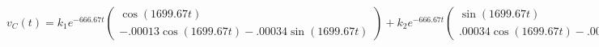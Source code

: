 \documentclass[preview]{standalone}
\begin{document}
\begin{center}
\[
                                                v_C(t) = k_1e^{-666.67t}
                                                \begin{pmatrix} 
                                                \cos(1699.67t) \\ 
                                                -.00013\cos(1699.67t) - .00034\sin(1699.67t)
                                                \end{pmatrix}
                                                + k_2e^{-666.67t}
                                                \begin{pmatrix} 
                                                \sin(1699.67t) \\ 
                                                .00034\cos(1699.67t) - .00013\sin(1699.67t)
                                                \end{pmatrix}
                                        \]
\end{center}
\end{document}

